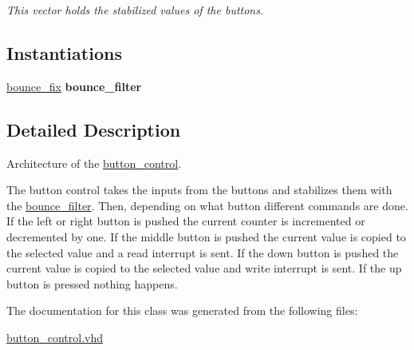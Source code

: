 \begin{DoxyCompactItemize}
\begin{DoxyCompactList}\small\item\em This vector holds the stabilized values of the buttons. \end{DoxyCompactList}\end{DoxyCompactItemize}
\subsection*{Instantiations}
 \begin{DoxyCompactItemize}
\item 
\hypertarget{classbutton__control_1_1control__button_a924c71cbbbc369e0a5cca302dfb6cf50}{\hyperlink{classbutton__control_1_1control__button_a924c71cbbbc369e0a5cca302dfb6cf50}{bounce\-\_\-fix}  {\bfseries bounce\-\_\-filter}   }\label{classbutton__control_1_1control__button_a924c71cbbbc369e0a5cca302dfb6cf50}

\end{DoxyCompactItemize}


\subsection{Detailed Description}
Architecture of the \hyperlink{classbutton__control}{button\-\_\-control}. 

The button control takes the inputs from the buttons and stabilizes them with the \hyperlink{classbounce__filter}{bounce\-\_\-filter}. Then, depending on what button different commands are done. If the left or right button is pushed the current counter is incremented or decremented by one. If the middle button is pushed the current value is copied to the selected value and a read interrupt is sent. If the down button is pushed the current value is copied to the selected value and write interrupt is sent. If the up button is pressed nothing happens. 

The documentation for this class was generated from the following files\-:\begin{DoxyCompactItemize}
\item 
\hyperlink{button__control_8vhd}{button\-\_\-control.\-vhd}\end{DoxyCompactItemize}
